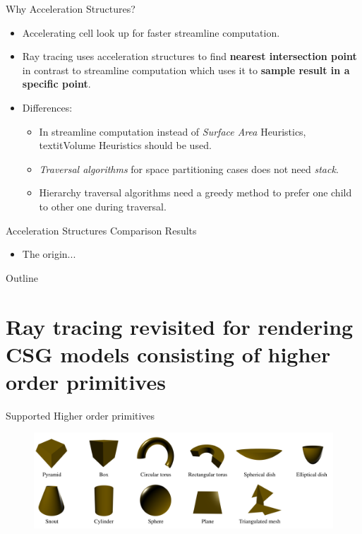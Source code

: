 \documentclass{beamer}
\begin{document}
\begin{frame}{Why Acceleration Structures?}
	\begin{itemize}
		\item Accelerating cell look up for faster streamline computation.
		\item Ray tracing uses acceleration structures to find \textbf{nearest intersection point} in contrast to streamline computation which uses it to \textbf{sample result in a specific point}.
		\item Differences:
		    \begin{itemize}
		    	\item In streamline computation instead of \textit{Surface Area} Heuristics, textit{Volume} Heuristics should be used.
		    	\item \textit{Traversal algorithms} for space partitioning cases does not need \textit{stack}.
		    	\item Hierarchy traversal algorithms need a greedy method to prefer one child to other one during traversal.
		    \end{itemize}
		
	\end{itemize}
\end{frame}

\begin{frame}{Acceleration Structures Comparison Results}
	\begin{itemize}
		\item The origin...
	\end{itemize}
\end{frame}


\begin{frame}{Outline}
	\tableofcontents
\end{frame}


\section{Ray tracing revisited for rendering CSG models consisting of higher order primitives}

\begin{frame}{Supported Higher order primitives}
	
	\begin{figure}[ht!]
		\centering
		\includegraphics[width=0.9\linewidth]{figures/hops.png}
	\end{figure}
\end{frame}
\end{document}
